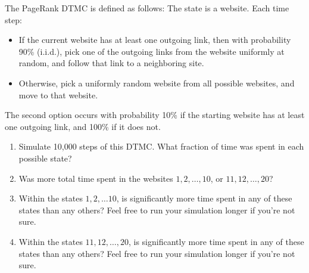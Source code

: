 \documentclass{article}
\begin{document}
\begin{enumerate}
            The PageRank DTMC is defined as follows:
            The state is a website.
            Each time step:
            \begin{itemize}
                \item If the current website has at least one outgoing link, then with probability 90\% (i.i.d.),
            pick one of the outgoing links from the website uniformly at random, and follow that link to a neighboring site.
            \item Otherwise, pick a uniformly random website from all possible websites, and move to that website.
            \end{itemize}
            The second option occurs with probability 10\% if the starting website has at least one outgoing link, and 100\% if it does not.
            \begin{enumerate}
                \item Simulate 10,000 steps of this DTMC. What fraction of time was spent in each possible state?
                \item Was more total time spent in the websites $1, 2, \ldots, 10$, or $11, 12, \ldots, 20$?
                \item Within the states $1, 2, \ldots 10$, is significantly more time spent in any of these states than any others? Feel free to run your simulation longer if you're not sure.
                \item Within the states $11, 12, \ldots, 20$,
                is significantly more time spent in any of these states than any others? Feel free to run your simulation longer if you're not sure.
            \end{enumerate}
\end{enumerate}
\end{document}
